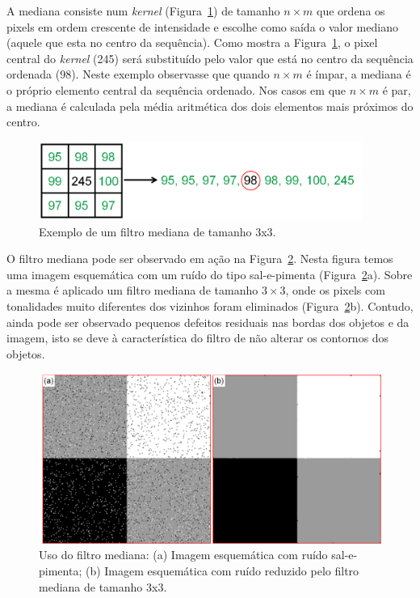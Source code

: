 A mediana consiste num \textit{kernel} (Figura~\ref{fig:form-median})
de tamanho $n \times m$ que ordena os pixels em ordem crescente de
intensidade e escolhe como saída o valor mediano (aquele que esta no
centro da sequência). Como mostra a Figura~\ref{fig:form-median}, o
pixel central do \textit{kernel} (245) será substituído pelo valor que
está no centro da sequência ordenada (98). Neste exemplo observasse
que quando $n \times m$ é ímpar, a mediana é o próprio elemento
central da sequência ordenado. Nos casos em que $n \times m$ é par, a
mediana é calculada pela média aritmética dos dois elementos mais
próximos do centro.\cite{92}

\begin{figure} [h]
  \begin{center}
    \includegraphics[height=73pt,width=300pt]{images/fig_form-median}
    \caption{Exemplo de um filtro mediana de tamanho
      3x3.}\label{fig:form-median}
  \end{center}
\end{figure}

O filtro mediana pode ser observado em ação na
Figura~\ref{fig:img-median}. Nesta figura temos uma imagem esquemática
com um ruído do tipo sal-e-pimenta
(Figura~\ref{fig:img-median}a). Sobre a mesma é aplicado um filtro
mediana de tamanho $3 \times 3$, onde os pixels com tonalidades muito
diferentes dos vizinhos foram eliminados
(Figura~\ref{fig:img-median}b). Contudo, ainda pode ser observado
pequenos defeitos residuais nas bordas dos objetos e da imagem, isto
se deve à característica do filtro de não alterar os contornos dos
objetos.

\begin{figure} [h]
  \begin{center}
    \includegraphics[scale=0.25]{images/fig_img-median}
    \caption{Uso do filtro mediana: (a) Imagem esquemática com ruído
      sal-e-pimenta; (b) Imagem esquemática com ruído reduzido pelo
      filtro mediana de tamanho 3x3.\cite{78}}\label{fig:img-median}
  \end{center}
\end{figure}

